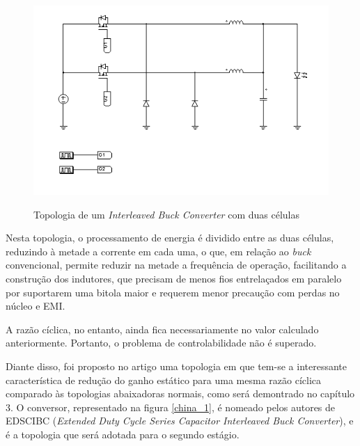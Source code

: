\documentclass[
        12pt,
        openany, %
        oneside, %
        a4paper,			
        english,			
        brazil
        ]{abntbibufjf}
\begin{document}
\begin{figure}[!h]
	\centering
	\caption{Topologia de um \textit{Interleaved Buck Converter} com duas células}
	\includegraphics[scale=.8]{../ESQUEMAS/_IBUCK.PNG}\\
	\label{ibuck}
\end{figure}

Nesta topologia, o processamento de energia é dividido entre as duas células, reduzindo à metade a corrente em cada uma, o que, em relação ao \textit{buck} convencional, permite reduzir na metade a frequência de operação, facilitando a construção dos indutores, que precisam de menos fios entrelaçados em paralelo por suportarem uma bitola maior e requerem menor precaução com perdas no núcleo e EMI.

A razão cíclica, no entanto, ainda fica necessariamente no valor calculado anteriormente. Portanto, o problema de controlabilidade não é superado.

Diante disso, foi proposto no artigo \cite{artigo_do_china} uma topologia em que tem-se a interessante característica de redução do ganho estático para uma mesma razão cíclica comparado às topologias abaixadoras normais, como será demontrado no capítulo 3. O conversor, representado na figura \ref{china_1}, é nomeado pelos autores de EDSCIBC (\textit{Extended Duty Cycle Series Capacitor Interleaved Buck Converter}), e é a topologia que será adotada para o segundo estágio.
\end{document}
